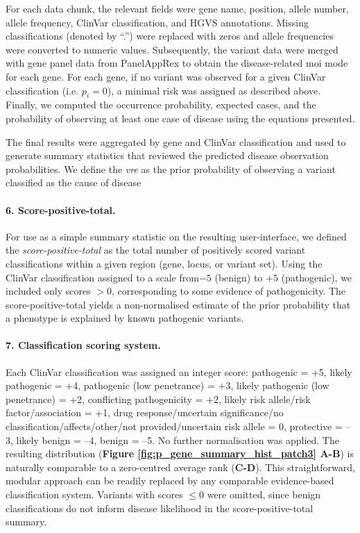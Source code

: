For each data chunk, the relevant fields were gene name, position, allele number, allele frequency, ClinVar classification, and HGVS annotations. 
Missing classifications (denoted by ``.'') were replaced with zeros and allele frequencies were converted to numeric values. %
Subsequently, the variant data were merged with gene panel data from PanelAppRex to obtain the disease-related \ac{moi} mode for each gene. 
For each gene, if no variant was observed for a given ClinVar classification (i.e. \(p_i = 0\)), a minimal risk was assigned as described above. 
Finally, we computed the occurrence probability, expected cases, and the probability of observing at least one case of disease using the equations presented.

The final results were aggregated by gene and ClinVar classification and used to generate summary statistics that reviewed the predicted disease observation probabilities.
We define the \emph{\ac{vre}} as the prior probability of observing a variant classified as the cause of disease 

\paragraph{6. Score-positive-total.}
For use as a simple summary statistic on the resulting user-interface, we defined the \emph{score-positive-total} as the total number of positively scored variant classifications within a given region (gene, locus, or variant set). 
Using the ClinVar classification assigned to a scale from$-5$ (benign) to $+5$ (pathogenic), we included only scores $> 0$, corresponding to some evidence of pathogenicity. 
The score-positive-total yields a non-normalised estimate of the prior probability that a phenotype is explained by known pathogenic variants.

\paragraph{7. Classification scoring system.}
\label{sec:classification_score}
Each ClinVar classification was assigned an integer score: pathogenic = +5, likely pathogenic = +4, pathogenic (low penetrance) = +3, likely pathogenic (low penetrance) = +2, conflicting pathogenicity = +2, likely risk allele/risk factor/association = +1, drug response/uncertain significance/no classification/affects/other/not provided/uncertain risk allele = 0, protective = –3, likely benign = –4, benign = –5. No further normalisation was applied. The resulting distribution (\textbf{Figure \ref{fig:p_gene_summary_hist_patch3} A-B}) is naturally comparable to a zero-centred average rank (\textbf{C-D}). This straightforward, modular approach can be readily replaced by any comparable evidence-based classification system. Variants with scores  $\leq 0$ were omitted, since benign classifications do not inform disease likelihood in the score-positive-total summary.

